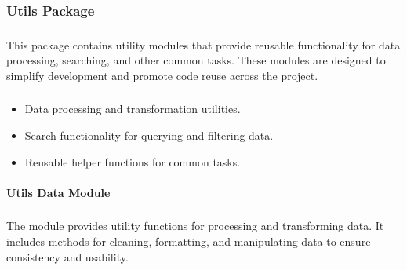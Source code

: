\documentclass[letterpaper,10pt,english]{sphinxmanual}
\begin{document}
\sphinxstepscope


\subsubsection{Utils Package}
\label{\detokenize{src.utils:utils-package}}\label{\detokenize{src.utils::doc}}\subsubsection*{}

\sphinxAtStartPar
This package contains utility modules that provide reusable functionality for data processing, searching, and other common tasks. These modules are designed to simplify development and promote code reuse across the project.
\subsubsection*{}
\begin{itemize}
\item {} 
\sphinxAtStartPar
Data processing and transformation utilities.

\item {} 
\sphinxAtStartPar
Search functionality for querying and filtering data.

\item {} 
\sphinxAtStartPar
Reusable helper functions for common tasks.

\end{itemize}


\paragraph{Utils Data Module}
\label{\detokenize{src.utils:module-src.utils.data}}\label{\detokenize{src.utils:utils-data-module}}\subsubsection*{}

\sphinxAtStartPar
The  module provides utility functions for processing and transforming data. It includes methods for cleaning, formatting, and manipulating data to ensure consistency and usability.
\end{document}
